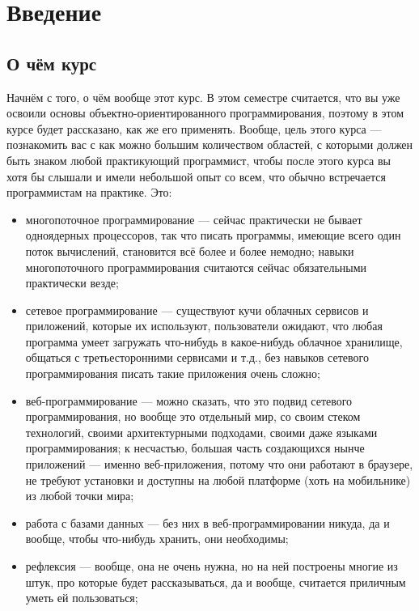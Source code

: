 \documentclass{../../text-style}
\begin{document}
\maketitle
\thispagestyle{empty}

\section{Введение}

\subsection{О чём курс}

Начнём с того, о чём вообще этот курс. В этом семестре считается, что вы уже освоили основы объектно-ориентированного программирования, поэтому в этом курсе будет рассказано, как же его применять. Вообще, цель этого курса --- познакомить вас с как можно большим количеством областей, с которыми должен быть знаком любой практикующий программист, чтобы после этого курса вы хотя бы слышали и имели небольшой опыт со всем, что обычно встречается программистам на практике. Это:

\begin{itemize}
    \item многопоточное программирование --- сейчас практически не бывает одноядерных процессоров, так что писать программы, имеющие всего один поток вычислений, становится всё более и более немодно; навыки многопоточного программирования считаются сейчас обязательными практически везде;
    \item сетевое программирование --- существуют кучи облачных сервисов и приложений, которые их используют, пользователи ожидают, что любая программа умеет загружать что-нибудь в какое-нибудь облачное хранилище, общаться с третьесторонними сервисами и т.д., без навыков сетевого программирования писать такие приложения очень сложно;
    \item веб-программирование --- можно сказать, что это подвид сетевого программирования, но вообще это отдельный мир, со своим стеком технологий, своими архитектурными подходами, своими даже языками программирования; к несчастью, большая часть создающихся нынче приложений --- именно веб-приложения, потому что они работают в браузере, не требуют установки и доступны на любой платформе (хоть на мобильнике) из любой точки мира;
    \item работа с базами данных --- без них в веб-программировании никуда, да и вообще, чтобы что-нибудь хранить, они необходимы;
    \item рефлексия --- вообще, она не очень нужна, но на ней построены многие из штук, про которые будет рассказываться, да и вообще, считается приличным уметь ей пользоваться;
\end{itemize}
\end{document}
